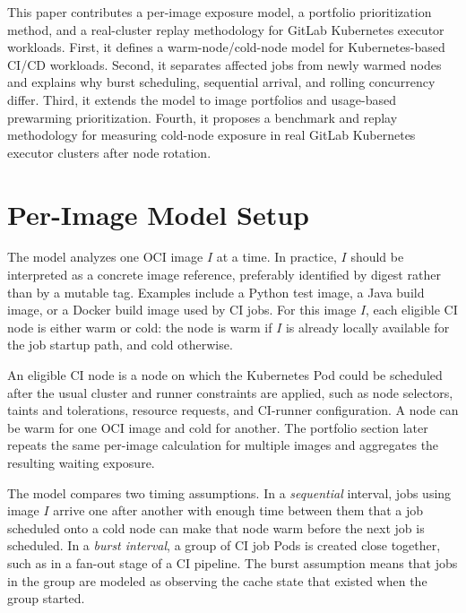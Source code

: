 \documentclass[11pt,a4paper]{article}
\begin{document}
This paper contributes a per-image exposure model, a portfolio prioritization method, and a real-cluster replay methodology for GitLab Kubernetes executor workloads. First, it defines a warm-node/cold-node model for Kubernetes-based CI/CD workloads. Second, it separates affected jobs from newly warmed nodes and explains why burst scheduling, sequential arrival, and rolling concurrency differ. Third, it extends the model to image portfolios and usage-based prewarming prioritization. Fourth, it proposes a benchmark and replay methodology for measuring cold-node exposure in real GitLab Kubernetes executor clusters after node rotation.

\section{Per-Image Model Setup}

The model analyzes one OCI image \(I\) at a time. In practice, \(I\) should be interpreted as a concrete image reference, preferably identified by digest rather than by a mutable tag. Examples include a Python test image, a Java build image, or a Docker build image used by CI jobs. For this image \(I\), each eligible CI node is either warm or cold: the node is warm if \(I\) is already locally available for the job startup path, and cold otherwise.

An eligible CI node is a node on which the Kubernetes Pod could be scheduled after the usual cluster and runner constraints are applied, such as node selectors, taints and tolerations, resource requests, and CI-runner configuration. A node can be warm for one OCI image and cold for another. The portfolio section later repeats the same per-image calculation for multiple images and aggregates the resulting waiting exposure.

The model compares two timing assumptions. In a \emph{sequential} interval, jobs using image \(I\) arrive one after another with enough time between them that a job scheduled onto a cold node can make that node warm before the next job is scheduled. In a \emph{burst interval}, a group of CI job Pods is created close together, such as in a fan-out stage of a CI pipeline. The burst assumption means that jobs in the group are modeled as observing the cache state that existed when the group started.
\end{document}
